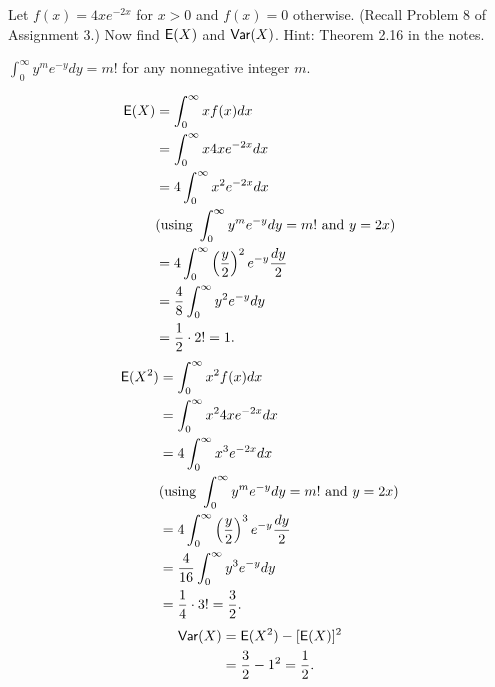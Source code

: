 \documentclass[12pt]{article}
\newcommand{\E}{{\sf E}}
\newcommand{\Var}{{\sf Var}}
\newenvironment{theorem}[2][Theorem]{\begin{trivlist}
\item[\hskip \labelsep {\bfseries #1}\hskip \labelsep {\bfseries #2.}]}
{\end{trivlist}}
\newenvironment{problem}[2][Problem]{\begin{trivlist}
\item[\hskip \labelsep {\bfseries #1}\hskip \labelsep {\bfseries #2.}]}
{\end{trivlist}}
\begin{document}
\begin{problem}{4}
  Let $f(x) = 4xe^{-2x}$ for $x > 0$ and $f(x) = 0$ otherwise.
  (Recall Problem 8 of Assignment 3.) Now find $\E(X)$ and $\Var(X)$. 
  Hint: Theorem 2.16 in the notes.
  \begin{theorem}{2.16}
    $\int_{0}^{\infty} y^me^{-y}dy = m!$ for any nonnegative integer $m$.
  \end{theorem}
  \[
    \begin{aligned}
      \E(X) &= \int_{0}^{\infty} x f(x) dx \\
      &= \int_{0}^{\infty} x 4x e^{-2x} dx \\
      &= 4 \int_{0}^{\infty} x^2 e^{-2x} dx \\
      &(\text{using } \int_{0}^{\infty} y^me^{-y}dy = m! 
      \text{ and } y = 2x) \\
      &= 4 \int_{0}^{\infty} \left(\frac{y}{2}\right)^2
      e^{-y} \frac{dy}{2} \\
      &= \frac{4}{8} \int_{0}^{\infty} y^2 e^{-y} dy \\
      &= \frac12 \cdot 2! = 1.
    \end{aligned}
  \]
  \[
    \begin{aligned}
      \E(X^2) &= \int_{0}^{\infty} x^2 f(x) dx \\
      &= \int_{0}^{\infty} x^2 4x e^{-2x} dx \\
      &= 4 \int_{0}^{\infty} x^3 e^{-2x} dx \\
      &(\text{using } \int_{0}^{\infty} y^me^{-y}dy = m! 
      \text{ and } y = 2x) \\
      &= 4 \int_{0}^{\infty} \left(\frac{y}{2}\right)^3
      e^{-y} \frac{dy}{2} \\
      &= \frac{4}{16} \int_{0}^{\infty} y^3 e^{-y} dy \\
      &= \frac14 \cdot 3! = \frac32.
    \end{aligned}
  \]
  \[
    \begin{aligned}
      \Var(X) &= \E(X^2) - [\E(X)]^2 \\
      &= \frac32 - 1^2 = \frac12.
    \end{aligned}
  \]
\end{problem}
\end{document}
